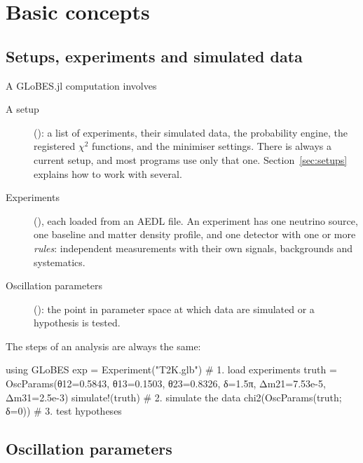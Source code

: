 \chapter{Basic concepts}\label{ch:basics}

\section{Setups, experiments and simulated data}

A GLoBES.jl computation involves
\begin{description}
  \item[A setup] (): a list of experiments, their simulated data,
    the probability engine, the registered $\chi^2$ functions, and the
    minimiser settings. There is always a current setup, and most programs use
    only that one. Section~\ref{sec:setups} explains how to work with several.
  \item[Experiments] (), each loaded from an AEDL file. An
    experiment has one neutrino source, one baseline and matter density
    profile, and one detector with one or more \emph{rules}: independent
    measurements with their own signals, backgrounds and systematics.
  \item[Oscillation parameters] (): the point in parameter
    space at which data are simulated or a hypothesis is tested.
\end{description}
The steps of an analysis are always the same:
\begin{julia}
using GLoBES
exp   = Experiment("T2K.glb")                       # 1. load experiments
truth = OscParams(θ12=0.5843, θ13=0.1503, θ23=0.8326,
                  δ=1.5π, Δm21=7.53e-5, Δm31=2.5e-3)
simulate!(truth)                                    # 2. simulate the data
chi2(OscParams(truth; δ=0))                         # 3. test hypotheses
\end{julia}

\section{Oscillation parameters}\label{sec:oscparams}

